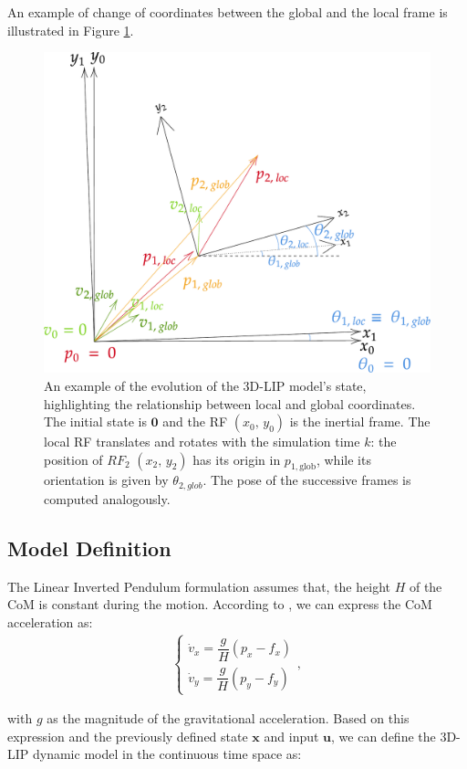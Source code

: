 An example of change of coordinates between the global and the local frame is illustrated in Figure \ref{fig:loc_to_glob_tfm}.

\begin{figure}[h]
    \centering
    \includegraphics[width=0.75\linewidth]{figures/LIP/loc_to_glob_tfm2.pdf}
    \caption{An example of the evolution of the 3D-LIP model's state, highlighting the relationship between local and global coordinates. The initial state is $\mathbf{0}$ and the RF $(x_0,\, y_0)$ is the inertial frame. The local RF translates and rotates with the simulation time $k$: the position of $RF_2$ $(x_2,\, y_2)$ has its origin in $p_{1, \text{glob}}$, while its orientation is given by $\theta_{2, glob}$. The pose of the successive frames is computed analogously.}
    \label{fig:loc_to_glob_tfm}
\end{figure}

\subsection{Model Definition}
The Linear Inverted Pendulum formulation assumes that, the height $H$ of the CoM is constant during the motion.
According to \cite{peng_main_paper}, we can express the CoM acceleration as:
\begin{align}
    \begin{cases}
        \dot{v}_{x} = \dfrac{g}{H}(p_{x} - f_{x})
        \\[1ex]
        \dot{v}_{y} = \dfrac{g}{H}(p_{y} - f_{y})
    \end{cases},
\end{align}

with $g$ as the magnitude of the gravitational acceleration.
Based on this expression and the previously defined state $\mathbf{x}$ and input $\mathbf{u}$, we can define the 3D-LIP dynamic model in the continuous time space as:

